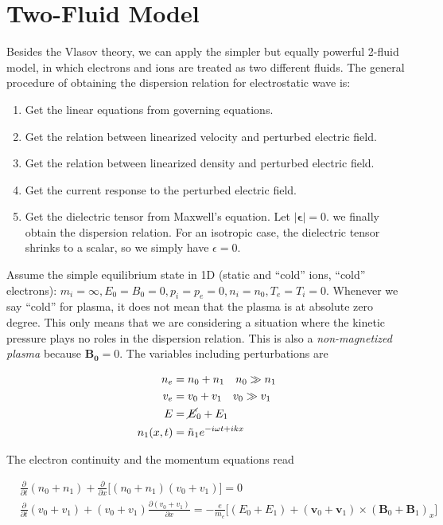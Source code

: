 \documentclass[
  notoc %
]{tufte-book}
\providecommand{\tightlist}{%
  \setlength{\itemsep}{0pt}\setlength{\parskip}{0pt}
}
\begin{document}
\hypertarget{sec:2fluid}{%
\section{Two-Fluid Model}\label{sec:2fluid}}

Besides the Vlasov theory, we can apply the simpler but equally powerful
2-fluid model, in which electrons and ions are treated as two different
fluids. The general procedure of obtaining the dispersion relation for
electrostatic wave is:

\begin{enumerate}
\def\labelenumi{\arabic{enumi}.}
\tightlist
\item
  Get the linear equations from governing equations.
\item
  Get the relation between linearized velocity and perturbed electric
  field.
\item
  Get the relation between linearized density and perturbed electric
  field.
\item
  Get the current response to the perturbed electric field.
\item
  Get the dielectric tensor from Maxwell's equation. Let
  \(|\pmb{\epsilon}|=0\). we finally obtain the dispersion relation. For
  an isotropic case, the dielectric tensor shrinks to a scalar, so we
  simply have \(\epsilon=0\).
\end{enumerate}

Assume the simple equilibrium state in 1D (static and ``cold'' ions,
``cold'' electrons):
\(m_i=\infty,E_0=B_0=0, p_i=p_e=0, n_i = n_0, T_e=T_i=0\). Whenever we
say ``cold'' for plasma, it does not mean that the plasma is at absolute
zero degree. This only means that we are considering a situation where
the kinetic pressure plays no roles in the dispersion relation. This is
also a \emph{non-magnetized plasma} because \(\mathbf{B_0} = 0\). The
variables including perturbations are

\[
\begin{aligned}
n_e &= n_0+n_1 \quad n_0\gg n_1\\
v_e &= v_0+v_1 \quad v_0\gg v_1 \\
E &= \cancel{E}_0 +E_1 \\
n_1(x,t)&=\tilde{n}_1e^{-i\omega t+ikx}
\end{aligned}
\]

The electron continuity and the momentum equations read

\[
\begin{aligned}
&\frac{\partial}{\partial t}(n_0+n_1)+\frac{\partial}{\partial x}\big[(n_0+n_1)(v_0+v_1)\big]=0 \\
&\frac{\partial}{\partial t}(v_0+v_1)+(v_0+v_1)\frac{\partial(v_0+v_1)}{\partial x}=-\frac{e}{m_e}\big[ (E_0+E_1)+(\mathbf{v}_0+\mathbf{v}_1)\times(\mathbf{B}_0+\mathbf{B}_1)_x \big]
\end{aligned}
\]
\end{document}
